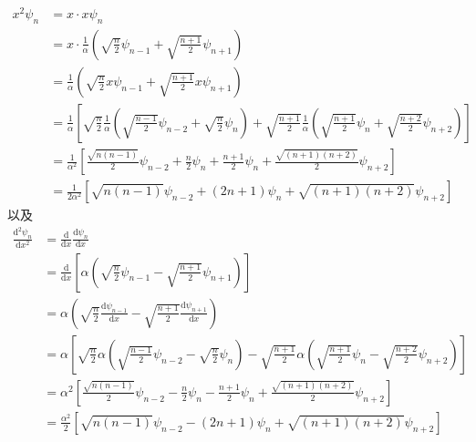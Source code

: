 \begin{equation}
    \begin{aligned}
        x^2\psi _n&=x\cdot x\psi _n
\\
&=x\cdot \frac{1}{\alpha}\left( \sqrt{\frac{n}{2}}\psi _{n-1}+\sqrt{\frac{n+1}{2}}\psi _{n+1} \right) 
\\
&=\frac{1}{\alpha}\left( \sqrt{\frac{n}{2}}x\psi _{n-1}+\sqrt{\frac{n+1}{2}}x\psi _{n+1} \right) 
\\
&=\frac{1}{\alpha}\left[ \sqrt{\frac{n}{2}}\frac{1}{\alpha}\left( \sqrt{\frac{n-1}{2}}\psi _{n-2}+\sqrt{\frac{n}{2}}\psi _n \right) +\sqrt{\frac{n+1}{2}}\frac{1}{\alpha}\left( \sqrt{\frac{n+1}{2}}\psi _n+\sqrt{\frac{n+2}{2}}\psi _{n+2} \right) \right] 
\\
&=\frac{1}{\alpha ^2}\left[ \frac{\sqrt{n\left( n-1 \right)}}{2}\psi _{n-2}+\frac{n}{2}\psi _n+\frac{n+1}{2}\psi _n+\frac{\sqrt{\left( n+1 \right) \left( n+2 \right)}}{2}\psi _{n+2} \right] 
\\
&=\frac{1}{2\alpha ^2}\left[ \sqrt{n\left( n-1 \right)}\psi _{n-2}+\left( 2n+1 \right) \psi _n+\sqrt{\left( n+1 \right) \left( n+2 \right)}\psi _{n+2} \right] 
    \end{aligned}
\end{equation}
以及
\begin{equation}
    \begin{aligned}
        \frac{\mathrm{d}^2\psi _n}{\mathrm{d}x^2}&=\frac{\mathrm{d}}{\mathrm{d}x}\frac{\mathrm{d}\psi _n}{\mathrm{d}x}
\\
&=\frac{\mathrm{d}}{\mathrm{d}x}\left[ \alpha \left( \sqrt{\frac{n}{2}}\psi _{n-1}-\sqrt{\frac{n+1}{2}}\psi _{n+1} \right) \right] 
\\
&=\alpha \left( \sqrt{\frac{n}{2}}\frac{\mathrm{d}\psi _{n-1}}{\mathrm{d}x}-\sqrt{\frac{n+1}{2}}\frac{\mathrm{d}\psi _{n+1}}{\mathrm{d}x} \right) 
\\
&=\alpha \left[ \sqrt{\frac{n}{2}}\alpha \left( \sqrt{\frac{n-1}{2}}\psi _{n-2}-\sqrt{\frac{n}{2}}\psi _n \right) -\sqrt{\frac{n+1}{2}}\alpha \left( \sqrt{\frac{n+1}{2}}\psi _n-\sqrt{\frac{n+2}{2}}\psi _{n+2} \right) \right] 
\\
&=\alpha ^2\left[ \frac{\sqrt{n\left( n-1 \right)}}{2}\psi _{n-2}-\frac{n}{2}\psi _n-\frac{n+1}{2}\psi _n+\frac{\sqrt{\left( n+1 \right) \left( n+2 \right)}}{2}\psi _{n+2} \right] 
\\
&=\frac{\alpha ^2}{2}\left[ \sqrt{n\left( n-1 \right)}\psi _{n-2}-\left( 2n+1 \right) \psi _n+\sqrt{\left( n+1 \right) \left( n+2 \right)}\psi _{n+2} \right] 
    \end{aligned}
\end{equation}
